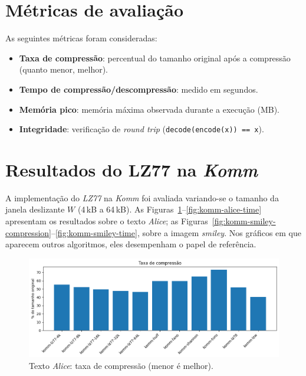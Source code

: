 \section{Métricas de avaliação}

As seguintes métricas foram consideradas:
\begin{itemize}
  \item \textbf{Taxa de compressão}: percentual do tamanho original após a compressão (quanto menor, melhor).
  \item \textbf{Tempo de compressão/descompressão}: medido em segundos.
  \item \textbf{Memória pico}: memória máxima observada durante a execução (MB).
  \item \textbf{Integridade}: verificação de \emph{round trip} (\texttt{decode(encode(x)) == x}).
\end{itemize}

\section{Resultados do LZ77 na \textit{Komm}}

A implementação do \textit{LZ77} na \textit{Komm} foi avaliada variando-se o tamanho da janela deslizante \(W\) (4\,kB a 64\,kB). As Figuras~\ref{fig:komm-alice-compression}–\ref{fig:komm-alice-time} apresentam os resultados sobre o texto \textit{Alice}; as Figuras~\ref{fig:komm-smiley-compression}–\ref{fig:komm-smiley-time}, sobre a imagem \textit{smiley}. Nos gráficos em que aparecem outros algoritmos, eles desempenham o papel de referência.

\begin{figure}[htp]
  \centering
  \caption{Texto \textit{Alice}: taxa de compressão (menor é melhor).}
  \label{fig:komm-alice-compression}
  \includegraphics[width=15cm]{figuras/komm_alice_compression.png}
\end{figure}

